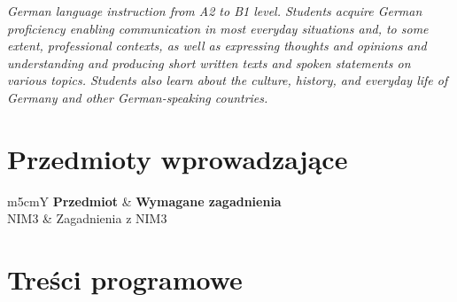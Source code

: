 \documentclass[12pt, a4paper]{article}
\newcommand{\thdrule}{\noalign{\global\setlength{\extrarowheight}{0pt}}}
\newcommand{\thdend}{\noalign{\global\setlength{\extrarowheight}{3pt}}}
\begin{document}
\textit{German language instruction from A2 to B1 level. Students acquire German proficiency enabling communication in most everyday situations and, to some extent, professional contexts, as well as expressing thoughts and opinions and understanding and producing short written texts and spoken statements on various topics. Students also learn about the culture, history, and everyday life of Germany and other German-speaking countries.}


\section{Przedmioty wprowadzające}

{\scriptsize
\begin{tabularx}{\textwidth}{m{5cm}Y}
\thdrule\toprule
{} {\color{white}\textbf{Przedmiot}} & {\color{white}\textbf{Wymagane zagadnienia}} \\
\midrule\thdend
   NIM3 & Zagadnienia z NIM3 \\
\bottomrule
\end{tabularx}}

\section{Treści programowe}
\end{document}

